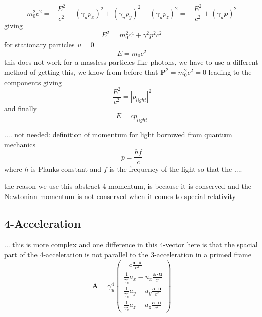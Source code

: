 \begin{equation}
	m^2_0 c^2 = - \frac{E^2}{c^2}  + (\gamma_u p_x)^2 + (\gamma_u p_y)^2 + (\gamma_u p_z)^2 = - \frac{E^2}{c^2}  + (\gamma_u p)^2
\end{equation}
giving
\begin{equation}
	E^2 = m_0^2c^4 +\gamma^2p^2c^2
\end{equation}
for stationary particles $u=0$
\begin{equation}
	E = m_0c^2
\end{equation}
this does not work for a massless particles like photons, we have to use a different method of getting this, we know from before that $ \mathbf{P}^2 = m_0^2 c^2 = 0$ leading to the components giving
\begin{equation}
	\frac{E^2}{c^2} = |p_{light}|^2
\end{equation}
and finally
\begin{equation}
	E = c p_{light}
\end{equation}

....
not needed:
definition of momentum for light borrowed from quantum mechanics
\begin{equation}
	p = \frac{hf}{c}
\end{equation}
where $h$ is Planks constant and $f$ is the frequency of the light
so that the
....

the reason we use this abstract 4-momentum, is because it is conserved and the Newtonian momentum is not conserved when it comes to special relativity


\subsection{4-Acceleration}
... this is more complex and one difference in this 4-vector here is that the spacial part of the 4-acceleration is not parallel to the 3-acceleration in a \hyperlink{def-Primed-Frame}{primed frame}
\begin{equation}
	\mathbf{A} = \gamma_u^4
	\begin{pmatrix}
		-c\frac{\mathbf{a}\cdot\mathbf{u}}{c^2}
		\\ \frac{1}{\gamma_u^2} a_x - u_x \frac{\mathbf{a}\cdot\mathbf{u}}{c^2}
		\\ \frac{1}{\gamma_u^2} a_y - u_y \frac{\mathbf{a}\cdot\mathbf{u}}{c^2}
		\\ \frac{1}{\gamma_u^2} a_z - u_z \frac{\mathbf{a}\cdot\mathbf{u}}{c^2}
	\end{pmatrix}
\end{equation}

